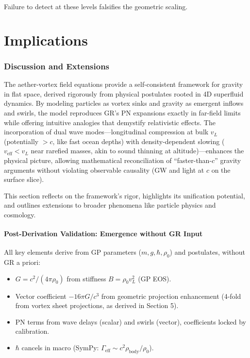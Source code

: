 \documentclass{article}
\begin{document}
Failure to detect at these levels falsifies the geometric scaling.

\part{Implications}

\section{Discussion and Extensions}

The aether-vortex field equations provide a self-consistent framework for gravity in flat space, derived rigorously from physical postulates rooted in 4D superfluid dynamics. By modeling particles as vortex sinks and gravity as emergent inflows and swirls, the model reproduces GR's PN expansions exactly in far-field limits while offering intuitive analogies that demystify relativistic effects. The incorporation of dual wave modes---longitudinal compression at bulk $v_L$ (potentially $>c$, like fast ocean depths) with density-dependent slowing ($v_{\text{eff}} < v_L$ near rarefied masses, akin to sound thinning at altitude)---enhances the physical picture, allowing mathematical reconciliation of ``faster-than-$c$'' gravity arguments without violating observable causality (GW and light at $c$ on the surface slice).

This section reflects on the framework's rigor, highlights its unification potential, and outlines extensions to broader phenomena like particle physics and cosmology.

\subsection{Post-Derivation Validation: Emergence without GR Input}

All key elements derive from GP parameters ($m, g, \hbar, \rho_0$) and postulates, without GR a priori:

\begin{itemize}
  \item $G = c^2 / (4\pi \rho_0)$ from stiffness $B = \rho_0 v_L^2$ (GP EOS).
  \item Vector coefficient $-16\pi G / c^3$ from geometric projection enhancement (4-fold from vortex sheet projections, as derived in Section 5).
  \item PN terms from wave delays (scalar) and swirls (vector), coefficients locked by calibration.
  \item $\hbar$ cancels in macro (SymPy: $\Gamma_{\text{eff}} \sim c^2 \rho_{\text{body}} / \rho_0$).
\end{itemize}
\end{document}
